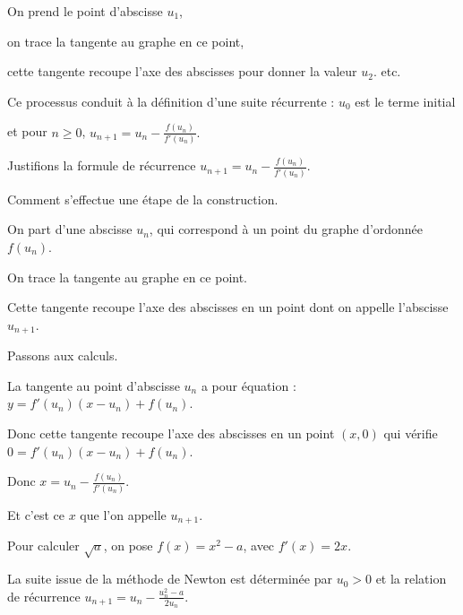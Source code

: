 \change

On prend le point d'abscisse $u_1$,

\change

on trace la tangente au graphe en ce point,

cette tangente recoupe l'axe des abscisses pour donner la valeur $u_2$.
etc.

\change

Ce processus conduit à la définition d'une suite récurrente :
$u_0$ est le terme initial

et pour $n \ge 0$, $u_{n+1} = u_n - \frac{f(u_n)}{f'(u_n)}.$

\diapo

Justifions la formule de récurrence $u_{n+1} = u_n - \frac{f(u_n)}{f'(u_n)}.$

\change

Comment s'effectue une étape de la construction.

On part d'une abscisse $u_n$, qui correspond à un point du graphe d'ordonnée $f(u_n)$.

\change

On trace la tangente au graphe en ce point.

\change

Cette tangente recoupe l'axe des abscisses en un point dont on appelle l'abscisse $u_{n+1}$.

\change

Passons aux calculs.

\change

La tangente au point d'abscisse $u_n$ a pour équation :
$y = f'(u_n)(x-u_n)+f(u_n)$. 

\change

Donc cette tangente recoupe l'axe des abscisses en un point $(x,0)$ 
qui vérifie $0=f'(u_n)(x-u_n)+f(u_n)$. 

\change

Donc $x=u_n - \frac{f(u_n)}{f'(u_n)}.$

Et c'est ce $x$ que l'on appelle $u_{n+1}$.

\diapo

Pour calculer $\sqrt{a}$, on pose $f(x)=x^2-a$, avec $f'(x)=2x$. 

La suite issue de la méthode de Newton est déterminée par $u_0>0$ 
et la relation de récurrence $u_{n+1} = u_n - \frac{u_n^2-a}{2u_n}$.

\change


